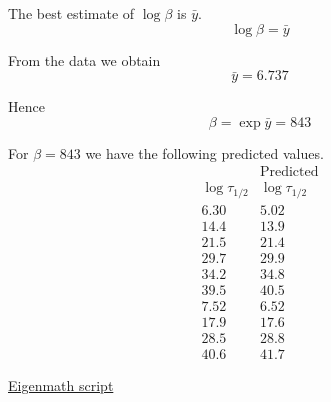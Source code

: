 The best estimate of $\log\beta$ is $\bar y$.
\begin{equation*}
\log\beta=\bar y
\end{equation*}

From the data we obtain
\begin{equation*}
\bar y=6.737
\end{equation*}

Hence
\begin{equation*}
\beta=\exp\bar y=843
\end{equation*}

For $\beta=843$ we have the following predicted values.
\begin{equation*}
\begin{matrix}
& \text{Predicted}
\\
\log\tau_{1/2} & \log\tau_{1/2}
\\[1ex]
6.30 & 5.02
\\
14.4 & 13.9
\\
21.5 & 21.4
\\
29.7 & 29.9
\\
34.2 & 34.8
\\
39.5 & 40.5
\\
7.52 & 6.52
\\
17.9 & 17.6
\\
28.5 & 28.8
\\
40.6 & 41.7
\end{matrix}
\end{equation*}

\href{https://georgeweigt.github.io/examples/alpha-decay-3-demo.html}{Eigenmath script}


